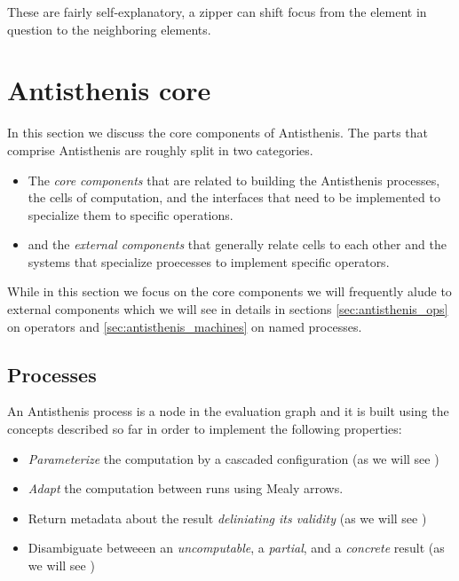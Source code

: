 These are fairly self-explanatory, a zipper can shift focus from the
element in question to the neighboring elements.

\section{Antisthenis core}

In this section we discuss the core components of Antisthenis. The
parts that comprise Antisthenis are roughly split in two
categories.

\begin{itemize}
\item The \emph{core components} that are related to building the
  Antisthenis processes, the cells of computation, and the interfaces
  that need to be implemented to specialize them to specific
  operations.
\item and the \emph{external components} that generally relate cells
  to each other and the systems that specialize proecesses to
  implement specific operators.
\end{itemize}

While in this section we focus on the core components we will
frequently alude to external components which we will see in details
in sections \ref{sec:antisthenis_ops} on operators and
\ref{sec:antisthenis_machines} on named processes.

\subsection{Processes}
\label{sec:antisthenis_processes}

An Antisthenis process is a node in the evaluation graph and it is
built using the concepts described so far in order to implement the
following properties:

\begin{itemize}
\item \emph{Parameterize} the computation by a cascaded configuration
  (as we will see )
\item \emph{Adapt} the computation between runs using Mealy arrows.
\item Return metadata about the result \emph{deliniating its validity}
  (as we will see )
\item Disambiguate betweeen an \emph{uncomputable}, a \emph{partial},
  and a \emph{concrete} result (as we will see )
\end{itemize}

